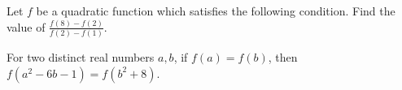 Let $f$ be a quadratic function which satisfies the following condition. Find the value of $\frac{f(8)-f(2)}{f(2)-f(1)}$.

For two distinct real numbers $a,b$, if $f(a)=f(b)$, then $f(a^2-6b-1)=f(b^2+8)$.
